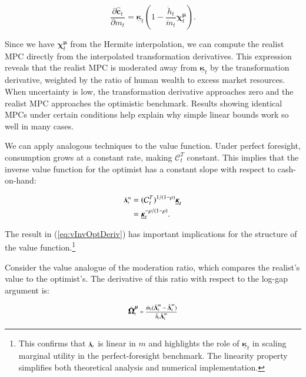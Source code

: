 \documentclass[twocolumn, switch]{article}
\newcommand{\CRRA}{\rho}
\newcommand{\mNrm}{m}
\newcommand{\cFunc}{\mathbf{c}}
\newcommand{\hNrm}{h}
\newcommand{\MPC}{\boldsymbol{\kappa}}
\newcommand{\MPCmin}{\underline{\MPC}}
\newcommand{\mNrmEx}{\ddot{\mNrm}}
\newcommand{\hNrmEx}{\ddot{\hNrm}}
\newcommand{\cFuncReal}{\hat{\cFunc}}
\newcommand{\logmNrmEx}{\boldsymbol{\mu}}
\newcommand{\logitModRte}{\boldsymbol{\chi}}
\newcommand{\PDVCoverc}{\mathcal{C}}
\newcommand{\vInv}{{\scriptsize \boldsymbol{\Lambda}}}
\newcommand{\vInvOpt}{\bar{\vInv}}
\newcommand{\vInvReal}{\hat{\vInv}}
\newcommand{\valModRte}{\boldsymbol{\Omega}}
\newcommand{\valModRteReal}{\hat{\valModRte}}
\newcommand{\logitModRteMu}{\logitModRte^{\logmNrmEx}}
\newcommand{\vInvOptDeriv}{\vInvOpt^{\mNrm}}
\newcommand{\vInvRealDeriv}{\vInvReal^{\mNrm}}
\newcommand{\valModRteRealDerivmu}{\valModRteReal^{\logmNrmEx}}
\begin{document}
\begin{equation}
\label{eq:MPCRecovery}
\frac{\partial \cFuncReal_{t}}{\partial \mNrm_{t}} = \MPCmin_{t} \left(1 - \frac{\hNrmEx_{t}}{\mNrmEx_{t}} \logitModRteMu_{t}\right).
\end{equation}

Since we have $\logitModRteMu_{t}$ from the Hermite interpolation, we can compute the realist MPC directly from the interpolated transformation derivatives. This expression reveals that the realist MPC is moderated away from $\MPCmin_{t}$ by the transformation derivative, weighted by the ratio of human wealth to excess market resources. When uncertainty is low, the transformation derivative approaches zero and the realist MPC approaches the optimistic benchmark. Results showing identical MPCs under certain conditions \citep{CKW2021Aggregation} help explain why simple linear bounds work so well in many cases.

We can apply analogous techniques to the value function. Under perfect foresight, consumption grows at a constant rate, making $\PDVCoverc_{t}^{T}$ constant. This implies that the inverse value function for the optimist has a constant slope with respect to cash-on-hand:

\begin{equation}
\label{eq:vInvOptDeriv}
\begin{aligned}
\vInvOptDeriv_{t} &= (\PDVCoverc_{t}^{T})^{1/(1-\CRRA)} \MPCmin_{t} \\
&= \MPCmin_{t}^{-\CRRA/(1-\CRRA)}.
\end{aligned}
\end{equation}

The result in (\ref{eq:vInvOptDeriv}) has important implications for the structure of the value function.\footnote{This confirms that $\vInvOpt_{t}$ is linear in $\mNrm$ and highlights the role of $\MPCmin_{t}$ in scaling marginal utility in the perfect-foresight benchmark. The linearity property simplifies both theoretical analysis and numerical implementation.}

Consider the value analogue of the moderation ratio, which compares the realist's value to the optimist's. The derivative of this ratio with respect to the log-gap argument is:

\begin{equation}
\label{eq:valModRteRealDerivmu}
\valModRteRealDerivmu_{t} = \frac{\mNrmEx_{t} (\vInvOptDeriv_{t} - \vInvRealDeriv_{t})}{\hNrmEx_{t} \vInvOptDeriv_{t}}
\end{equation}
\end{document}
